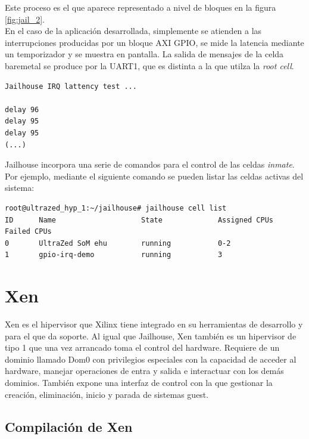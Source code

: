 Este proceso es el que aparece representado a nivel de bloques en la figura \ref{fig:jail_2}.\\

En el caso de la aplicación desarrollada, simplemente se atienden a las interrupciones producidas por un bloque \acrshort{AXI} \acrshort{GPIO}, se mide la latencia mediante un temporizador y se muestra en pantalla. La salida de mensajes de la celda baremetal se produce por la \acrshort{UART}1, que es distinta a la que utilza la \textit{root cell}.

\begin{lstlisting}[style=CStyle]
Jailhouse IRQ lattency test ...

delay 96
delay 95
delay 95
(...)
\end{lstlisting}

Jailhouse incorpora una serie de comandos para el control de las celdas \textit{inmate}. Por ejemplo, mediante el siguiente comando se pueden listar las celdas activas del sistema:

\begin{lstlisting}[style=CStyle]
root@ultrazed_hyp_1:~/jailhouse# jailhouse cell list
ID      Name                    State             Assigned CPUs           Failed CPUs
0       UltraZed SoM ehu        running           0-2
1       gpio-irq-demo           running           3
\end{lstlisting}

\section{Xen}

Xen es el hipervisor que Xilinx tiene integrado en su herramientas de desarrollo y para el que da soporte. Al igual que Jailhouse, Xen también es un hipervisor de tipo 1 que una vez arrancado toma el control del hardware. Requiere de un dominio llamado Dom0 con privilegios especiales con la capacidad de acceder al hardware, manejar operaciones de entra y salida e interactuar con los demás dominios. También expone una interfaz de control con la que gestionar la creación, eliminación, inicio y parada de sistemas guest.


\subsection{Compilación de Xen} \label{xen_compilacion}

